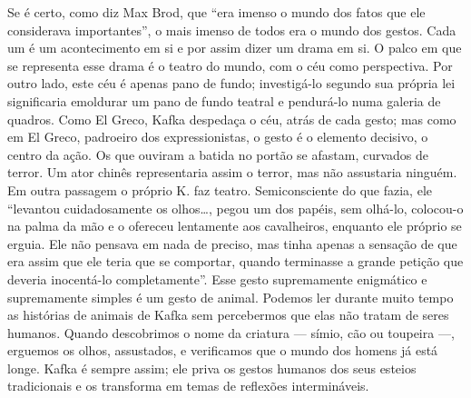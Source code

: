 Se é certo, como diz Max Brod, que ``era imenso o mundo dos fatos que
ele considerava importantes'', o mais imenso de todos era o mundo dos
gestos. Cada um é um acontecimento em si e por assim dizer um drama em
si. O palco em que se representa esse drama é o teatro do mundo, com o
céu como perspectiva. Por outro lado, este céu é apenas pano de fundo;
investigá-lo segundo sua própria lei significaria emoldurar um pano de
fundo teatral e pendurá-lo numa galeria de quadros. Como El Greco, Kafka
despedaça o céu, atrás de cada gesto; mas como em El Greco, padroeiro
dos expressionistas, o gesto é o elemento decisivo, o centro da ação. Os
que ouviram a batida no portão se afastam, curvados de terror. Um ator
chinês representaria assim o terror, mas não assustaria ninguém. Em
outra passagem o próprio K. faz teatro. Semiconsciente do que fazia, ele
``levantou cuidadosamente os olhos\ldots{}, pegou um dos papéis, sem olhá-lo,
colocou-o na palma da mão e o ofereceu lentamente aos cavalheiros,
enquanto ele próprio se erguia. Ele não pensava em nada de preciso, mas
tinha apenas a sensação de que era assim que ele teria que se comportar,
quando terminasse a grande petição que deveria inocentá-lo
completamente''. Esse gesto supremamente enigmático e supremamente
simples é um gesto de animal. Podemos ler durante muito tempo as
histórias de animais de Kafka sem percebermos que elas não tratam de
seres humanos. Quando descobrimos o nome da criatura --- símio, cão ou
toupeira ---, erguemos os olhos, assustados, e verificamos que o mundo
dos homens já está longe. Kafka é sempre assim; ele priva os gestos
humanos dos seus esteios tradicionais e os transforma em temas de
reflexões intermináveis.

